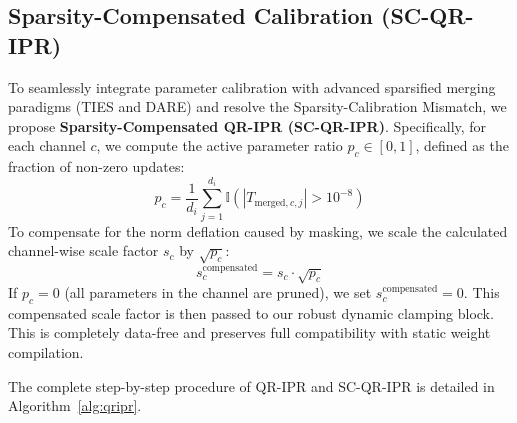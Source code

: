 \documentclass{article}
\theoremstyle{plain}
\theoremstyle{definition}
\theoremstyle{remark}
\begin{document}
\subsection{Sparsity-Compensated Calibration (SC-QR-IPR)}
To seamlessly integrate parameter calibration with advanced sparsified merging paradigms (TIES and DARE) and resolve the Sparsity-Calibration Mismatch, we propose \textbf{Sparsity-Compensated QR-IPR (SC-QR-IPR)}. Specifically, for each channel $c$, we compute the active parameter ratio $p_c \in [0, 1]$, defined as the fraction of non-zero updates:
\begin{equation}
    p_c = \frac{1}{d_i} \sum_{j=1}^{d_i} \mathbb{I}(|T_{\text{merged}, c, j}| > 10^{-8})
\end{equation}
To compensate for the norm deflation caused by masking, we scale the calculated channel-wise scale factor $s_c$ by $\sqrt{p_c}$:
\begin{equation}
    s_c^{\text{compensated}} = s_c \cdot \sqrt{p_c}
\end{equation}
If $p_c = 0$ (all parameters in the channel are pruned), we set $s_c^{\text{compensated}} = 0$. This compensated scale factor is then passed to our robust dynamic clamping block. This is completely data-free and preserves full compatibility with static weight compilation.

The complete step-by-step procedure of QR-IPR and SC-QR-IPR is detailed in Algorithm~\ref{alg:qripr}.
\end{document}
